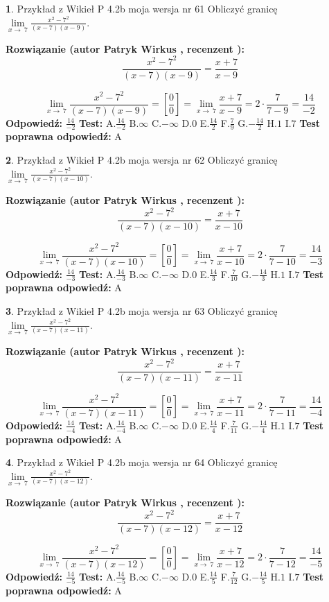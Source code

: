 \documentclass[12pt, a4paper]{article}
\theoremstyle{definition} %
\newtheorem{zad}{}
\newcommand{\zadStart}[1]{\begin{zad}#1\newline}
\newcommand{\zadStop}{\end{zad}}
\newcommand{\rozwStart}[2]{\noindent \textbf{Rozwiązanie (autor #1 , recenzent #2): }\newline}
\newcommand{\rozwStop}{\newline}
\newcommand{\odpStart}{\noindent \textbf{Odpowiedź:}\newline}
\newcommand{\odpStop}{\newline}
\newcommand{\testStart}{\noindent \textbf{Test:}\newline}
\newcommand{\testStop}{\newline}
\newcommand{\kluczStart}{\noindent \textbf{Test poprawna odpowiedź:}\newline}
\newcommand{\kluczStop}{\newline}
\begin{document}
\zadStart{Przykład z Wikieł P 4.2b moja wersja nr 61}
Obliczyć granicę $\lim\limits_{x\to\ 7}\frac{x^{2}-7^{2}}{(x-7)(x-9)}$.
\zadStop
\rozwStart{Patryk Wirkus}{}
$$\frac{x^{2}-7^{2}}{(x-7)(x-9)}=\frac{x+7}{x-9}$$

$$\lim\limits_{x\to\ 7}\frac{x^{2}-7^{2}}{(x-7)(x-9)}=[\frac{0}{0}]=\lim\limits_{x\to\ 7}\frac{x+7}{x-9}=2 \cdot \frac{7}{7-9} = \frac{14}{-2}$$
\rozwStop
\odpStart
$\frac{14}{-2}$
\odpStop
\testStart
A.$\frac{14}{-2}$
B.$\infty$
C.$-\infty$
D.$0$
E.$\frac{14}{2}$
F.$\frac{7}{9}$
G.$-\frac{14}{2}$
H.$1$
I.$7$
\testStop
\kluczStart
A
\kluczStop



\zadStart{Przykład z Wikieł P 4.2b moja wersja nr 62}
Obliczyć granicę $\lim\limits_{x\to\ 7}\frac{x^{2}-7^{2}}{(x-7)(x-10)}$.
\zadStop
\rozwStart{Patryk Wirkus}{}
$$\frac{x^{2}-7^{2}}{(x-7)(x-10)}=\frac{x+7}{x-10}$$

$$\lim\limits_{x\to\ 7}\frac{x^{2}-7^{2}}{(x-7)(x-10)}=[\frac{0}{0}]=\lim\limits_{x\to\ 7}\frac{x+7}{x-10}=2 \cdot \frac{7}{7-10} = \frac{14}{-3}$$
\rozwStop
\odpStart
$\frac{14}{-3}$
\odpStop
\testStart
A.$\frac{14}{-3}$
B.$\infty$
C.$-\infty$
D.$0$
E.$\frac{14}{3}$
F.$\frac{7}{10}$
G.$-\frac{14}{3}$
H.$1$
I.$7$
\testStop
\kluczStart
A
\kluczStop



\zadStart{Przykład z Wikieł P 4.2b moja wersja nr 63}
Obliczyć granicę $\lim\limits_{x\to\ 7}\frac{x^{2}-7^{2}}{(x-7)(x-11)}$.
\zadStop
\rozwStart{Patryk Wirkus}{}
$$\frac{x^{2}-7^{2}}{(x-7)(x-11)}=\frac{x+7}{x-11}$$

$$\lim\limits_{x\to\ 7}\frac{x^{2}-7^{2}}{(x-7)(x-11)}=[\frac{0}{0}]=\lim\limits_{x\to\ 7}\frac{x+7}{x-11}=2 \cdot \frac{7}{7-11} = \frac{14}{-4}$$
\rozwStop
\odpStart
$\frac{14}{-4}$
\odpStop
\testStart
A.$\frac{14}{-4}$
B.$\infty$
C.$-\infty$
D.$0$
E.$\frac{14}{4}$
F.$\frac{7}{11}$
G.$-\frac{14}{4}$
H.$1$
I.$7$
\testStop
\kluczStart
A
\kluczStop



\zadStart{Przykład z Wikieł P 4.2b moja wersja nr 64}
Obliczyć granicę $\lim\limits_{x\to\ 7}\frac{x^{2}-7^{2}}{(x-7)(x-12)}$.
\zadStop
\rozwStart{Patryk Wirkus}{}
$$\frac{x^{2}-7^{2}}{(x-7)(x-12)}=\frac{x+7}{x-12}$$

$$\lim\limits_{x\to\ 7}\frac{x^{2}-7^{2}}{(x-7)(x-12)}=[\frac{0}{0}]=\lim\limits_{x\to\ 7}\frac{x+7}{x-12}=2 \cdot \frac{7}{7-12} = \frac{14}{-5}$$
\rozwStop
\odpStart
$\frac{14}{-5}$
\odpStop
\testStart
A.$\frac{14}{-5}$
B.$\infty$
C.$-\infty$
D.$0$
E.$\frac{14}{5}$
F.$\frac{7}{12}$
G.$-\frac{14}{5}$
H.$1$
I.$7$
\testStop
\kluczStart
A
\kluczStop
\end{document}
